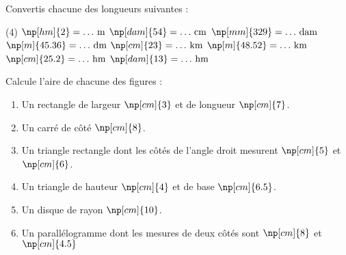 \documentclass{classe-tex3R}
\begin{document}
\begin{enonce}
	Convertis chacune des longueurs suivantes :

	\begin{tasks}[style=enumerate](4)
		\task $\np[hm]{2} = \dots\,\text{m}$
		\task $\np[dam]{54} = \dots\,\text{cm}$
		\task $\np[mm]{329} = \dots\,\text{dam}$
		\task $\np[m]{45.36} = \dots\,\text{dm}$
		\task $\np[cm]{23} = \dots\,\text{km}$
		\task $\np[m]{48.52} = \dots\,\text{km}$
		\task $\np[cm]{25.2} = \dots\,\text{hm}$
		\task $\np[dam]{13} = \dots\,\text{hm}$
	\end{tasks}
\end{enonce}



\begin{enonce}
	Calcule l'aire de chacune des figures :

	\begin{enumerate}[leftmargin=*]
			\item Un rectangle de largeur $\np[cm]{3}$ et de longueur $\np[cm]{7}$.
			\item Un carré de côté $\np[cm]{8}$.
			\item Un triangle rectangle dont les côtés de l'angle droit mesurent $\np[cm]{5}$   et $\np[cm]{6}$.
			\item Un triangle de hauteur $\np[cm]{4}$ et de base $\np[cm]{6.5}$.
			\item Un disque de rayon $\np[cm]{10}$.
			\item Un parallélogramme dont les mesures de deux côtés sont $\np[cm]{8}$ et $\np[cm]{4.5}$
	\end{enumerate}
\end{enonce}

\newpage


\end{document}
